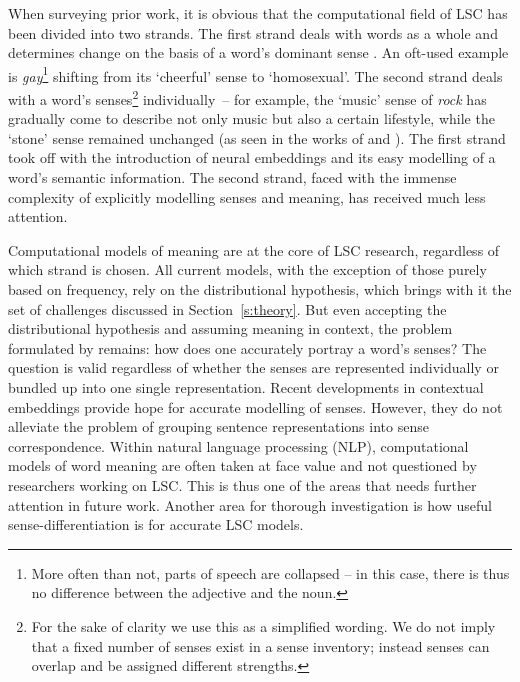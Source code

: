 \documentclass[output=paper]{langscibook}
\begin{document}
When surveying prior work, it is obvious that the computational field of LSC has been divided into two strands. 
The first strand deals with words as a whole and determines change on the basis of a word's dominant sense \citep[e.g.][]{kim-etal-2014-temporal, kulkarni2015statistically}.  
An oft-used example is \emph{gay}\footnote{More often than not, parts of speech are collapsed -- in this case, there is thus no difference between the adjective and the noun.} shifting from its `cheerful' sense to `homosexual'. 
The second strand deals with a word's senses\footnote{For the sake of clarity we use this as a simplified wording. We do not imply that a fixed number of senses exist in a sense inventory; instead senses can overlap and be assigned different strengths.} individually~-- for example, the `music' sense of \emph{rock} has gradually come to describe not only music but also a certain lifestyle, while the `stone' sense remained unchanged (as seen in the works of \citealt{tahmasebi2013models} and \citealt{mitra2015automatic}).  
The first strand took off with the introduction of neural embeddings and its easy modelling of a word's semantic information. The second strand, faced with the immense complexity of explicitly modelling senses and meaning, has received much less attention. 

Computational models of meaning are at the core of LSC research, regardless of which strand is chosen. All current models, with the exception of those purely based on frequency, rely on the distributional hypothesis, which brings with it the set of challenges discussed in Section~\ref{s:theory}. But even accepting the distributional hypothesis and assuming meaning in context, the problem formulated by \citet{schutze1998} remains: how does one accurately portray a word's senses? The question is valid regardless of whether the senses are represented individually or bundled up into one single representation. Recent developments in contextual embeddings \citep[e.g.][]{peters-etal-2018-deep} provide hope for accurate modelling of senses. However, they do not alleviate the problem of grouping sentence representations into sense correspondence. Within natural language processing (NLP), computational models of word meaning are often taken at face value and not questioned by researchers working on LSC. This is thus one of the areas that needs further attention in future work. Another area for thorough investigation is how useful sense-differentiation is for accurate LSC models. 
\end{document}
